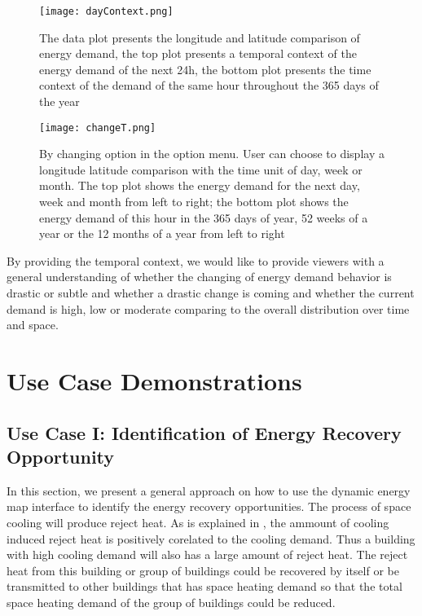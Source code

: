 \begin{figure}[h!]
  \centering
  \texttt{[image: dayContext.png]}
  \caption[Data Plot with Duration / Step of One Day]{The data plot
    presents the longitude and latitude comparison of energy demand,
    the top plot presents a temporal context of the energy demand of
    the next 24h, the bottom plot presents the time context of the
    demand of the same hour throughout the 365 days of the year}
  \label{fig:dayContext}
\end{figure}

\begin{figure}[h!]
  \centering
  \texttt{[image: changeT.png]}
  \caption[Data Plot with Different Duration / Step]{By changing
    option in the option menu. User can choose to display a longitude
    latitude comparison with the time unit of day, week or month. The
    top plot shows the energy demand for the next day, week and month
    from left to right; the bottom plot shows the energy demand of
    this hour in the 365 days of year, 52 weeks of a year or the 12
    months of a year from left to right}
  \label{fig:dayContext}
\end{figure}

By providing the temporal context, we would like to provide viewers
with a general understanding of whether the changing of energy demand
behavior is drastic or subtle and whether a drastic change is coming
and whether the current demand is high, low or moderate comparing to
the overall distribution over time and space.

\pagebreak
\section{Use Case Demonstrations}
\subsection{Use Case I: Identification of Energy Recovery Opportunity}
In this section, we present a general approach on how to use the
dynamic energy map interface to identify the energy recovery
opportunities. The process of space cooling will produce reject
heat. As is explained in , the ammount of
cooling induced reject heat is positively corelated to the cooling
demand. Thus a building with high cooling demand will also has a large
amount of reject heat. The reject heat from this building or group of
buildings could be recovered by itself or be transmitted to other
buildings that has space heating demand so that the total space
heating demand of the group of buildings could be reduced.

